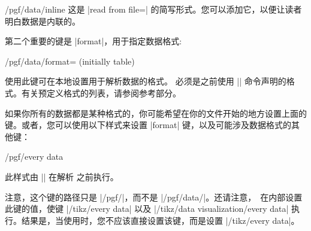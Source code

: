 \begin{command}{\pgfdata{}}
\begin{key}{/pgf/data/inline}
        这是 |read from file={}| 的简写形式。您可以添加它，以便让读者明白数据是内联的。
    \end{key}
    第二个重要的键是 |format|，用于指定数据格式:
    \begin{key}{/pgf/data/format= (initially table)} %

        使用此键可在本地设置用于解析数据的格式。 必须是之前使用 |\pgfdeclaredataformat| 命令声明的格式。有关预定义格式的列表，请参阅参考部分。
    \end{key}
    如果你所有的数据都是某种格式的，你可能希望在你的文件开始的地方设置上面的键。或者，您可以使用以下样式来设置 |format| 键，以及可能涉及数据格式的其他键：
    \begin{stylekey}{/pgf/every data}

        此样式由 |\pgfdata| 在解析  之前执行。


        注意，这个键的路径只是 |/pgf/|，而不是 |/pgf/data/|。还请注意，\tikzname\ 在内部设置此键的值，使键 |/tikz/every data| 以及 |/tikz/data visualization/every data| 执行。结果是，当使用\tikzname 时，您不应该直接设置该键，而是设置 |/tikz/every data|。
    \end{stylekey}

    \medskip


\end{command}
